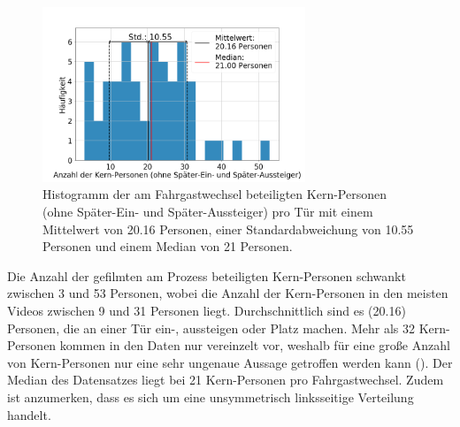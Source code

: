 \begin{figure}[H]
	\centering
		\includegraphics[width=0.7\textwidth]{pictures/data_evaluation/transferTime/hist_core_persons.png}
	\caption{Histogramm der am Fahrgastwechsel beteiligten Kern-Personen (ohne Später-Ein- und Später-Aussteiger) pro Tür mit einem Mittelwert von 20.16 Personen, einer Standardabweichung von 10.55 Personen und einem Median von 21 Personen.}
	\label{fig:histPersonen}
\end{figure}
Die Anzahl der gefilmten am Prozess beteiligten Kern-Personen schwankt zwischen 3 und 53 Personen, wobei die Anzahl der Kern-Personen in den meisten Videos zwischen 9 und 31 Personen liegt. Durchschnittlich sind es  (20.16) Personen, die an einer Tür ein-, aussteigen oder Platz machen. Mehr als 32 Kern-Personen kommen in den Daten nur vereinzelt vor, weshalb für eine große Anzahl von Kern-Personen nur eine sehr ungenaue Aussage getroffen werden kann (\cite{Fahrmeir.2009}). Der Median des Datensatzes liegt bei 21 Kern-Personen pro Fahrgastwechsel. Zudem ist anzumerken, dass es sich um eine unsymmetrisch linksseitige Verteilung handelt.

